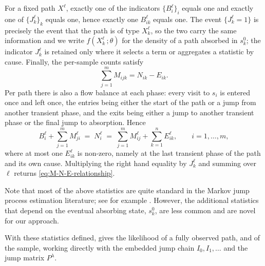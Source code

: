\documentclass{article}
\newcommand{\subchg}[1]{#1}
\begin{document}
For a fixed path $X^\ell$, exactly one of the indicators $\{B_i^\ell\}_i$ equals one and exactly one of $\{J_k^\ell\}_k$ equals one, hence exactly one $B_{ik}^\ell$ equals one. \subchg{The event $\{J_k^\ell = 1\}$ is precisely the event that the path is of type $X^\ell_k$, so the two carry the same information and we write $f(X^\ell_k\,;\theta)$ for the density of a path absorbed in $s^0_k$; the indicator $J_k^\ell$ is retained only where it selects a term or aggregates a statistic by cause.} Finally, the per-sample counts satisfy
%
\begin{equation}
\label{eq:M-N-E-relationship}
\sum_{j=1}^m M_{ijk} = N_{ik} - E_{ik}.
\end{equation}
%
\subchg{Per path there is also a flow balance at each phase: every visit to $s_i$ is entered once and
left once, the entries being either the start of the path or a jump from another transient phase, and
the exits being either a jump to another transient phase or the final jump to absorption. Hence}
%
\begin{equation}
\label{eq:flow-balance}
B_i^\ell + \sum_{j=1}^m M_{ji}^\ell
\;=\;
N_i^\ell
\;=\;
\sum_{j=1}^m M_{ij}^\ell + \sum_{k=1}^n E_{ik}^\ell,
\qquad i=1,\ldots,m,
\end{equation}
%
\subchg{where at most one $E^\ell_{ik}$ is non-zero, namely at the last transient phase of the path
and its own cause. Multiplying the right hand equality by $J^\ell_k$ and summing over $\ell$ returns
\eqref{eq:M-N-E-relationship}.}

Note that most of the above statistics are quite standard in the Markov jump process estimation literature; see for example \citet{Albert}. However, the additional statistics that depend on the eventual absorbing state, $s_k^0$, are less common and are novel for our approach.

\subchg{With these statistics defined, \Cref{prop:path-likelihood} gives the likelihood of a fully
observed path, and of the sample, working directly with the embedded jump chain $I_0,I_1,\ldots$ and
the jump matrix $P^\lambda$.}
\end{document}
